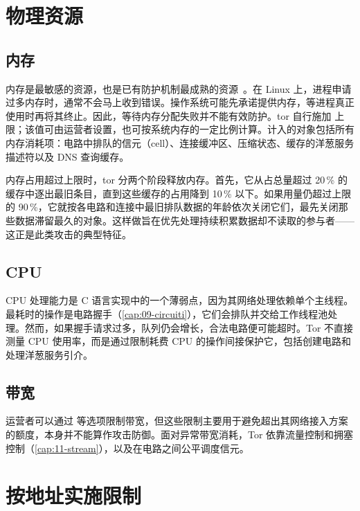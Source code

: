 \section{物理资源}\label{sec:dos-risorse}

\subsection{内存}

内存是最敏感的资源，也是已有防护机制最成熟的资源~。在 Linux 上，进程申请过多内存时，通常不会马上收到错误。操作系统可能先承诺提供内存，等进程真正使用时再将其终止。因此，等待内存分配失败并不能有效防护。tor 自行施加  上限；该值可由运营者设置，也可按系统内存的一定比例计算。计入的对象包括所有内存消耗项：电路中排队的信元（cell）、连接缓冲区、压缩状态、缓存的洋葱服务描述符以及 DNS 查询缓存。

内存占用超过上限时，tor 分两个阶段释放内存。首先，它从占总量超过 20\,\% 的缓存中逐出最旧条目，直到这些缓存的占用降到 10\,\% 以下。如果用量仍超过上限的 90\,\%，它就按各电路和连接中最旧排队数据的年龄依次关闭它们，最先关闭那些数据滞留最久的对象。这样做旨在优先处理持续积累数据却不读取的参与者——这正是此类攻击的典型特征。

\subsection{CPU}

CPU 处理能力是 C 语言实现中的一个薄弱点，因为其网络处理依赖单个主线程。最耗时的操作是电路握手（\cref{cap:09-circuiti}），它们会排队并交给工作线程池处理。然而，如果握手请求过多，队列仍会增长，合法电路便可能超时。Tor 不直接测量 CPU 使用率，而是通过限制耗费 CPU 的操作间接保护它，包括创建电路和处理洋葱服务引介。

\subsection{带宽}

运营者可以通过  等选项限制带宽，但这些限制主要用于避免超出其网络接入方案的额度，本身并不能算作攻击防御。面对异常带宽消耗，Tor 依靠流量控制和拥塞控制（\cref{cap:11-stream}），以及在电路之间公平调度信元。

\section{按地址实施限制}\label{sec:dos-limiti}


